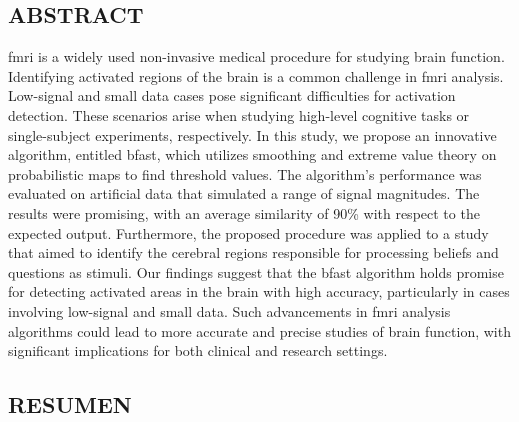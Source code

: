 \vspace*{0.5in}
\begin{center}
\section*{ABSTRACT}
\end{center}

\acrfull{fmri} is a widely used non-invasive medical procedure for studying 
brain function. Identifying activated regions of the brain is a common challenge 
in \acrshort{fmri} analysis. Low-signal and small data cases pose significant 
difficulties for activation detection. These scenarios arise when studying 
high-level cognitive tasks or single-subject experiments, respectively. In 
this study, we propose an innovative algorithm, entitled \acrfull{bfast}, 
which utilizes smoothing and extreme value theory on probabilistic maps to 
find threshold values. The algorithm's performance was evaluated on artificial 
data that simulated a range of signal magnitudes. The results were promising, 
with an average similarity of 90\% with respect to the expected output. 
Furthermore, the proposed procedure was applied to a study that aimed to 
identify the cerebral regions responsible for processing beliefs and questions 
as stimuli. Our findings suggest that the \acrshort{bfast} algorithm holds 
promise for detecting activated areas in the brain with high accuracy, 
particularly in cases involving low-signal and small data. Such advancements 
in \acrshort{fmri} analysis algorithms could lead to more accurate and precise 
studies of brain function, with significant implications for both clinical and 
research settings.

\newpage

\vspace*{0.5in}
\begin{center}
\section*{RESUMEN}
\end{center}

